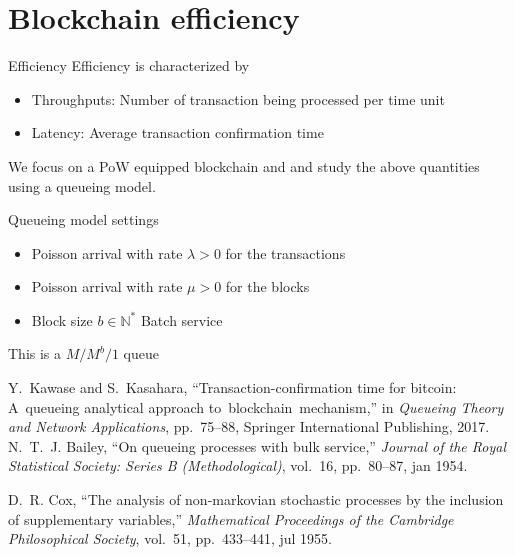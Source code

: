 \documentclass{beamer}
\begin{document}
\section{Blockchain efficiency}
\begin{frame}{Efficiency}
Efficiency is characterized by 
\begin{itemize}
  \item Throughputs: Number of transaction being processed per time unit
  \item Latency: Average transaction confirmation time
\end{itemize}
We focus on a PoW equipped blockchain and and study the above quantities using a queueing model.
\end{frame}
\begin{frame}{Queueing model settings}
\begin{itemize}
\item Poisson arrival with rate $\lambda>0$ for the transactions
\item Poisson arrival with rate $\mu>0$ for the blocks 
\item Block size $b\in\mathbb{N}^\ast$
Batch service
\end{itemize}
This is a $M/M^b/1$ queue \cite{Bailey1954} \cite{Cox1955}
\tiny
\begin{thebibliography}{1}
Y.~Kawase and S.~Kasahara, ``Transaction-confirmation time for bitcoin:
  A~queueing analytical approach to~blockchain~mechanism,'' in {\em Queueing
  Theory and Network Applications}, pp.~75--88, Springer International
  Publishing, 2017.
N.~T.~J. Bailey, ``On queueing processes with bulk service,'' {\em Journal of
  the Royal Statistical Society: Series B (Methodological)}, vol.~16,
  pp.~80--87, jan 1954.

D.~R. Cox, ``The analysis of non-markovian stochastic processes by the
  inclusion of supplementary variables,'' {\em Mathematical Proceedings of the
  Cambridge Philosophical Society}, vol.~51, pp.~433--441, jul 1955.

\end{thebibliography}
\end{frame}
\end{document}
